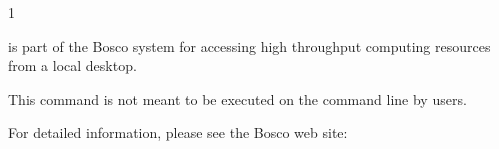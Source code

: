 \begin{ManPage}{\label{man-bosco-ssh-start}}{1}
{}


\Synopsis {}

\Description

{ is part of the Bosco system for accessing high
throughput computing resources from a local desktop.

This command is not meant to be executed on the command line by users.

For detailed information, please see the Bosco web site:
}


\end{ManPage}
